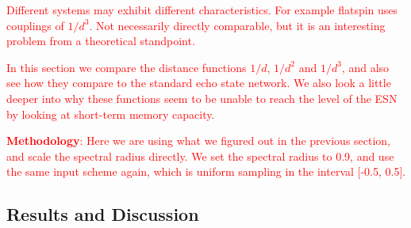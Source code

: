 \textcolor{red}{
  Different systems may exhibit different characteristics. For example flatspin
uses couplings of $1/d^3$. Not necessarily directly comparable, but it is an
interesting problem from a theoretical standpoint.
}

\textcolor{red}{
  In this section we compare the distance functions $1/d$, $1/d^2$ and $1/d^3$,
and also see how they compare to the standard echo state network. We also look a
little deeper into why these functions seem to be unable to reach the level of
the ESN by looking at short-term memory capacity.
}

\textcolor{red}{
  \textbf{Methodology}: Here we are using what we figured out in the previous
section, and scale the spectral radius directly. We set the spectral radius to
0.9, and use the same input scheme again, which is uniform sampling in the
interval [-0.5, 0.5].
}

\subsection{Results and Discussion}

